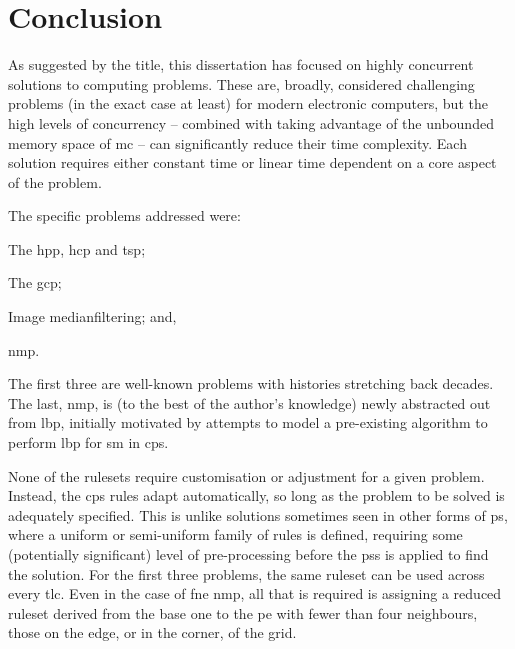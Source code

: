 \chapter{\label{chap:conc}Conclusion}


As suggested by the title, this dissertation has focused on highly concurrent solutions to computing problems.  These are, broadly, considered challenging problems (in the exact case at least) for modern electronic computers, but the high levels of concurrency -- combined with taking advantage of the unbounded memory space of \gls{mc} -- can significantly reduce their time complexity.  Each solution requires either constant time or linear time dependent on a core aspect of the problem.

The specific problems addressed were:
\begin{inparaenum}[(1)]
\item The \gls{hpp}, \gls{hcp} and \gls{tsp};
\item The \gls{gcp};
\item Image \gls{medianfilter}ing; and,
\item \gls{nmp}.
\end{inparaenum}
The first three are well-known problems with histories stretching back decades.  The last, \gls{nmp}, is (to the best of the author's knowledge) newly abstracted out from \gls{lbp}, initially motivated by attempts to model a pre-existing algorithm to perform \gls{lbp} for \gls{sm} in \gls{cps}.

None of the \glspl{ruleset} require customisation or adjustment for a given problem.  Instead, the \gls{cps} rules adapt automatically, so long as the problem to be solved is adequately specified.  This is unlike solutions sometimes seen in other forms of \gls{ps}, where a uniform or semi-uniform family of rules is defined, requiring some (potentially significant) level of pre-processing before the \glspl{ps} is applied to find the solution.  For the first three problems, the same \gls{ruleset} can be used across every \gls{tlc}.  Even in the case of \gls{fne} \gls{nmp}, all that is required is assigning a reduced \gls{ruleset} derived from the base one to the \gls{pe} with fewer than four neighbours, \ie{} those on the edge, or in the corner, of the grid.

